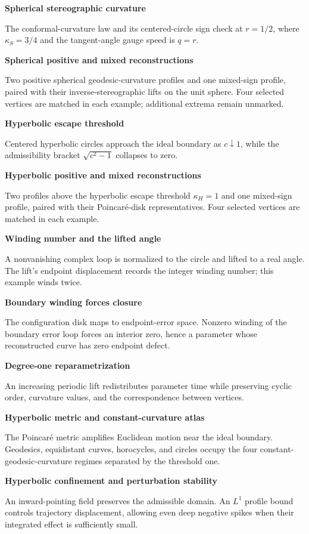 \documentclass[a4paper,landscape]{article}
\newcommand{\illustrationpage}[3]{%
  \begin{center}
    \vspace*{\fill}
    {\LARGE\bfseries #2\par}
    \vspace{1.25cm}
    \resizebox{0.98\textwidth}{!}{}%
    \vspace{1.1cm}

    \begin{minipage}{0.86\textwidth}
      \centering\large #3
    \end{minipage}
    \vspace*{\fill}
  \end{center}%
}
\begin{document}
\newpage
\illustrationpage{sphere-stereographic}
  {Spherical stereographic curvature}
  {The conformal-curvature law and its centered-circle sign check at
   $r=1/2$, where $\kappa_S=3/4$ and the tangent-angle gauge speed is $q=r$.}

\newpage
\illustrationpage{sphere-reconstructions}
  {Spherical positive and mixed reconstructions}
  {Two positive spherical geodesic-curvature profiles and one mixed-sign profile,
   paired with their inverse-stereographic lifts on the unit sphere. Four selected vertices are
   matched in each example; additional extrema remain unmarked.}

\newpage
\illustrationpage{hyperbolic-escape}
  {Hyperbolic escape threshold}
  {Centered hyperbolic circles approach the ideal boundary as
   $c\downarrow1$, while the admissibility bracket
   $\sqrt{c^2-1}$ collapses to zero.}

\newpage
\illustrationpage{hyperbolic-reconstructions}
  {Hyperbolic positive and mixed reconstructions}
  {Two profiles above the hyperbolic escape threshold $\kappa_H=1$ and one
   mixed-sign profile, paired with their Poincaré-disk representatives. Four
   selected vertices are matched in each example.}

\newpage
\illustrationpage{winding-angle-lift}
  {Winding number and the lifted angle}
  {A nonvanishing complex loop is normalized to the circle and lifted to a
   real angle. The lift's endpoint displacement records the integer winding
   number; this example winds twice.}

\newpage
\illustrationpage{winding-error-map}
  {Boundary winding forces closure}
  {The configuration disk maps to endpoint-error space. Nonzero winding of
   the boundary error loop forces an interior zero, hence a parameter whose
   reconstructed curve has zero endpoint defect.}

\newpage
\illustrationpage{degree-one-reparametrization}
  {Degree-one reparametrization}
  {An increasing periodic lift redistributes parameter time while preserving
   cyclic order, curvature values, and the correspondence between vertices.}

\newpage
\illustrationpage{hyperbolic-geometry-atlas}
  {Hyperbolic metric and constant-curvature atlas}
  {The Poincaré metric amplifies Euclidean motion near the ideal boundary.
   Geodesics, equidistant curves, horocycles, and circles occupy the four
   constant-geodesic-curvature regimes separated by the threshold one.}

\newpage
\illustrationpage{hyperbolic-flow-stability}
  {Hyperbolic confinement and perturbation stability}
  {An inward-pointing field preserves the admissible domain. An $L^1$ profile
   bound controls trajectory displacement, allowing even deep negative spikes
   when their integrated effect is sufficiently small.}
\end{document}

